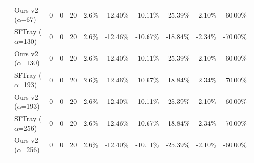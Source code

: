 \begin{table}[t]
{\begin{tabular}{ll|cccc|ccc|cc}
 & Ours v2 ($\alpha$=67) & 0 & 0 & 20 & 2.6\% & -12.40\% & -10.11\% & -25.39\% & -2.10\% & -60.00\% \\

\addlinespace[0.3em]

 & SFTray ($\alpha$=130) & 0 & 0 & 20 & 2.6\% & -12.46\% & -10.67\% & -18.84\% & -2.34\% & -70.00\% \\

 & Ours v2 ($\alpha$=130) & 0 & 0 & 20 & 2.6\% & -12.40\% & -10.11\% & -25.39\% & -2.10\% & -60.00\% \\

\addlinespace[0.3em]

 & SFTray ($\alpha$=193) & 0 & 0 & 20 & 2.6\% & -12.46\% & -10.67\% & -18.84\% & -2.34\% & -70.00\% \\

 & Ours v2 ($\alpha$=193) & 0 & 0 & 20 & 2.6\% & -12.40\% & -10.11\% & -25.39\% & -2.10\% & -60.00\% \\

\addlinespace[0.3em]

 & SFTray ($\alpha$=256) & 0 & 0 & 20 & 2.6\% & -12.46\% & -10.67\% & -18.84\% & -2.34\% & -70.00\% \\

 & Ours v2 ($\alpha$=256) & 0 & 0 & 20 & 2.6\% & -12.40\% & -10.11\% & -25.39\% & -2.10\% & -60.00\% \\

\addlinespace[0.3em]

\midrule

\bottomrule

\end{tabular}

}

\end{table}

